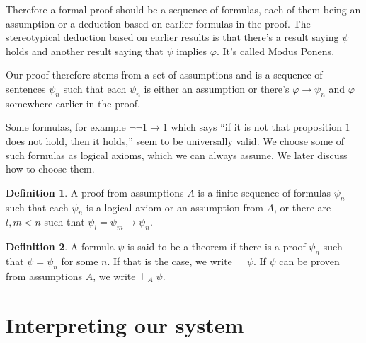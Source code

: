 \documentclass[11pt,oneside,%
]{memoir}
\theoremstyle{definition}
\newtheorem{maaritelma}{Definition}
\begin{document}
Therefore a formal proof should be a sequence of formulas, each of them being an assumption or a deduction based on earlier formulas in the proof. The stereotypical deduction based on earlier results is that there's a result saying \(\psi\) holds and another result saying that \(\psi\) implies \(\varphi\). It's called Modus Ponens.

Our proof therefore stems from a set of assumptions and is a sequence of sentences \(\psi_n\) such that each \(\psi_n\) is either an assumption or there's \(\varphi\rightarrow \psi_n\) and \(\varphi\) somewhere earlier in the proof.

Some formulas, for example \(\neg\neg1\rightarrow1\) which says ``if it is not that proposition \(1\) does not hold, then it holds,'' seem to be universally valid. We choose some of such formulas as logical axioms, which we can always assume. We later discuss how to choose them.%

\begin{maaritelma}
A proof from assumptions \(A\) is a finite sequence of formulas \(\psi_n\) such that each \(\psi_n\) is a logical axiom or an assumption from \(A\), or there are \(l,m<n\) such that \(\psi_l=\psi_m\rightarrow \psi_n\).
\end{maaritelma}
\begin{maaritelma}
A formula \(\psi\) is said to be a theorem if there is a proof \(\psi_n\) such that \(\psi=\psi_n\) for some \(n\). If that is the case, we write \(\vdash\psi\). If \(\psi\) can be proven from assumptions \(A\), we write \(\vdash_A\psi\).
\end{maaritelma}

%

\section{Interpreting our system}
\end{document}
